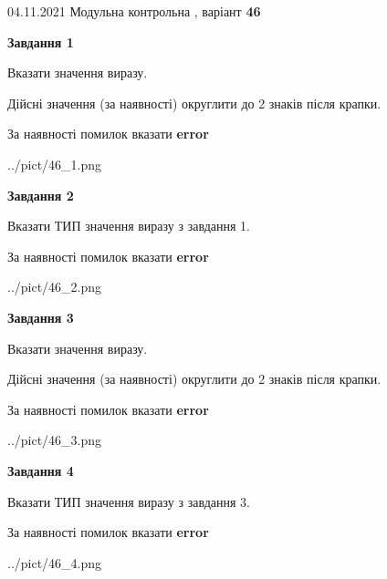\documentclass[11pt, ukrainian]{article}
\begin{document}
{04.11.2021 Модульна контрольна , варіант  \No \textbf { 46 }\par}
{
\begin {large}
{\begin {center}\textbf{Завдання 1}\end {center}}\par
Вказати значення виразу. \par
Дійсні значення (за наявності) округлити до 2 знаків після крапки. \par
За наявності помилок вказати \textbf{error}

\begin{center}
	{../pict/46_1.png}
\end{center}
\newpage

{\begin {center}\textbf{Завдання 2}\end {center}}\par
Вказати ТИП значення виразу з завдання 1. \par
За наявності помилок вказати \textbf{error}

\begin{center}
	{../pict/46_2.png}
\end{center}
\newpage

{\begin {center}\textbf{Завдання 3}\end {center}}\par
Вказати значення виразу. \par
Дійсні значення (за наявності) округлити до 2 знаків після крапки. \par
За наявності помилок вказати \textbf{error}

\begin{center}
	{../pict/46_3.png}
\end{center}
\newpage

{\begin {center}\textbf{Завдання 4}\end {center}}\par
Вказати ТИП значення виразу з завдання 3. \par
За наявності помилок вказати \textbf{error}

\begin{center}
	{../pict/46_4.png}
\end{center}
\newpage


\end{large}}
\end{document}
